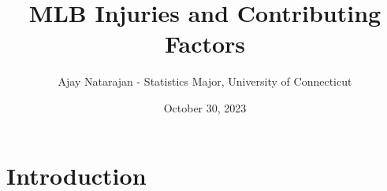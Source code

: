 \documentclass{article}
\title{MLB Injuries and Contributing Factors}
\author{Ajay Natarajan - Statistics Major, University of Connecticut}
\date{October 30, 2023}
\begin{document}
\maketitle

\section{Introduction}
\end{document}
